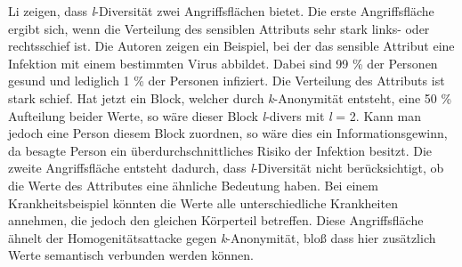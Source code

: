 Li \etal \cite{P-25} zeigen, dass \textit{l}-Diversität zwei Angriffsflächen bietet.
Die erste Angriffsfläche ergibt sich, wenn die Verteilung des sensiblen Attributs sehr stark links- oder rechtsschief ist.
Die Autoren zeigen ein Beispiel, bei der das sensible Attribut eine Infektion mit einem bestimmten Virus abbildet.
Dabei sind 99 \% der Personen gesund und lediglich 1 \% der Personen infiziert. 
Die Verteilung des Attributs ist stark schief. 
Hat jetzt ein Block, welcher durch \textit{k}-Anonymität entsteht, eine 50 \% Aufteilung beider Werte, so wäre dieser Block \textit{l}-divers mit \textit{l} = 2. 
Kann man jedoch eine Person diesem Block zuordnen, so wäre dies ein Informationsgewinn, da besagte Person ein überdurchschnittliches Risiko der Infektion besitzt.
Die zweite Angriffsfläche entsteht dadurch, dass \textit{l}-Diversität nicht berücksichtigt, ob die Werte des Attributes eine ähnliche Bedeutung haben.
Bei einem Krankheitsbeispiel könnten die Werte alle unterschiedliche Krankheiten annehmen, die jedoch den gleichen Körperteil betreffen.
Diese Angriffsfläche ähnelt der Homogenitätsattacke gegen \textit{k}-Anonymität, bloß dass hier zusätzlich Werte semantisch verbunden werden können.

